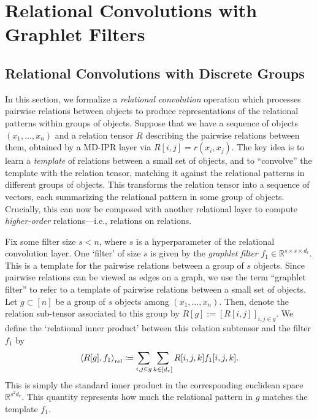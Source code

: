 \section{Relational Convolutions with Graphlet Filters}\label{sec:relconv}

\subsection{Relational Convolutions with Discrete Groups}\label{ssec:relconv_discrete_groups}
In this section, we formalize a \textit{relational convolution} operation which processes pairwise relations between objects to produce representations of the relational patterns within groups of objects. Suppose that we have a sequence of objects $(x_1, \ldots, x_n)$ and a relation tensor $R$ describing the pairwise relations between them, obtained by a MD-IPR layer via $R[i,j] = r(x_i, x_j)$. The key idea is to learn a \textit{template} of relations between a small set of objects, and to ``convolve'' the template with the relation tensor, matching it against the relational patterns in different groups of objects. This transforms the relation tensor into a sequence of vectors, each summarizing the relational pattern in some group of objects. Crucially, this can now be composed with another relational layer to compute \textit{higher-order} relations---i.e., relations on relations.

Fix some filter size $s < n$, where $s$ is a hyperparameter of the relational convolution layer. One `filter' of size $s$ is given by the \textit{graphlet filter} $f_1 \in \mathbb{R}^{s \times s \times d_r}$. This is a template for the pairwise relations between a group of $s$ objects. 
Since pairwise relations can be viewed as edges on a graph, we use the term ``graphlet filter'' to refer to a template of pairwise relations between a small set of objects.
Let $g \subset [n]$ be a group of $s$ objects among $(x_1, \ldots, x_n)$. Then, denote the relation sub-tensor associated to this group by $R[g] := [R[i,j]]_{i,j \in g}$. We define the `relational inner product' between this relation subtensor and the filter $f_1$ by
\begin{equation}\label{eq:relational_inner_prod_one_filt}
    \left\langle R[g], f_1 \right\rangle_\mathrm{rel} \coloneqq \sum_{i,j \in g} \sum_{k \in [d_r]} R[i,j,k] f_1[i,j,k].
\end{equation}
This is simply the standard inner product in the corresponding euclidean space $\mathbb{R}^{s^2 d_r}$. This quantity represents how much the relational pattern in $g$ matches the template $f_1$.

